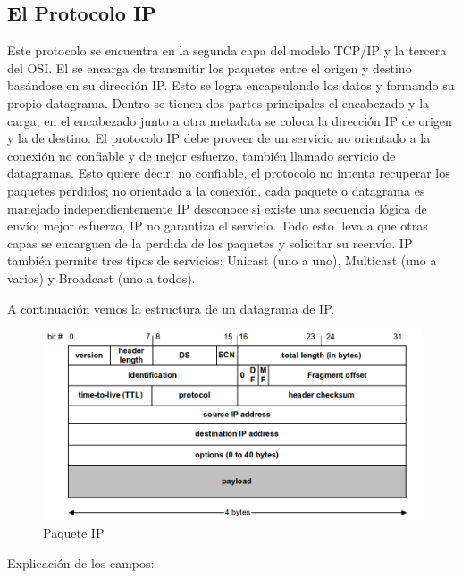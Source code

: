 \documentclass[11pt,a4paper]{article}
\begin{document}
\subsection{El Protocolo IP}
Este protocolo se encuentra en la segunda capa del modelo TCP/IP y la tercera del OSI. El se encarga
de transmitir los paquetes entre el origen y destino basándose en su dirección IP. Esto se logra
encapsulando los datos y formando su propio datagrama. Dentro se tienen dos partes principales el
encabezado y la carga, en el encabezado junto a otra metadata se coloca la dirección IP de origen y 
la de destino. El protocolo IP debe proveer de un servicio no orientado a la conexión no confiable y 
de mejor esfuerzo, también llamado servicio de datagramas. Esto quiere decir: no confiable, el 
protocolo no intenta recuperar los paquetes perdidos; no orientado a la conexión, cada paquete o 
datagrama es manejado independientemente IP desconoce si existe una secuencia lógica de envío; mejor
esfuerzo, IP no garantiza el servicio. Todo esto lleva a que otras capas se encarguen de la perdida
de los paquetes y solicitar su reenvío. IP también permite tres tipos de servicios: Unicast (uno a 
uno), Multicast (uno a varios) y Broadcast (uno a todos).\par
A continuación vemos la estructura de un datagrama de IP.
\begin{figure}[h!]
 \centering
 \includegraphics[width=1\textwidth]{ipDatagram.png}
 \caption[Paquete IP]{Paquete IP}
\end{figure}\par
Explicación de los campos:\par
\end{document}
